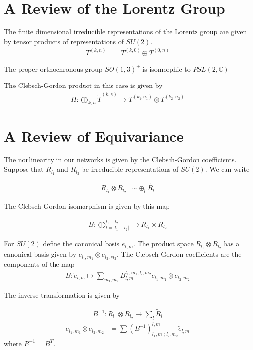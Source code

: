 \documentclass[book.tex]{subfiles}
\begin{document}
\section{A Review of the Lorentz Group}

The finite dimensional irreducible representations of the Lorentz group are given by tensor products of representations of $SU(2)$.
\begin{align}
    T^{(k,n)} &= T^{(k, 0)} \oplus T^{(0, n)}
\end{align}

The proper orthochronous group $SO(1,3)^+$ is isomorphic to $PSL(2, \mathbb{C})$ %

The Clebsch-Gordon product in this case is given by
\begin{align}
    H: \bigoplus_{k, n} \tilde{T}^{(k,n)} \to T^{(k_1, n_1)} \otimes T^{(k_2, n_2)}
\end{align}


\section{A Review of Equivariance}

The nonlinearity in our networks is given by the Clebsch-Gordon coefficients. Suppose that $R_{l_1}$ and $R_{l_2}$ be irreducible representations of $SU(2)$. We can write

\begin{align}
    R_{l_1} \otimes R_{l_2} &\sim \oplus_{l} \tilde{R_l}
\end{align}

The Clebsch-Gordon isomorphism is given by this map

\begin{align}
    B: \bigoplus_{l=|l_1-l_2|}^{l_1+l_2} \to R_{l_1} \times R_{l_2}
\end{align}

For $SU(2)$ define the canonical basis $e_{l,m}$. The product space $R_{l_1}\otimes R_{l_2}$ has a canonical basis given by $e_{l_1,m_1} \otimes e_{l_2, m_2}$. The Clebsch-Gordon coefficients are the components of the map
\begin{align}
    B: \tilde{e}_{l,m} \mapsto \sum_{m_1, m_2} B^{l_1,m_1;l_2,m_2}_{l,m} e_{l_1,m_1} \otimes e_{l_2,m_2}
\end{align}

The inverse transformation is given by 

\begin{align}
    B^{-1}: R_{l_1} \otimes R_{l_2} \to \sum_{l} \tilde{R}_l
\end{align}
\begin{align}
    e_{l_1, m_1} \otimes e_{l_2, m_2} &= \sum (B^{-1})^{l,m}_{l_1,m_1;l_2,m_2} \tilde{e}_{l,m}
\end{align}
where $B^{-1} = B^T$. 
\end{document}
